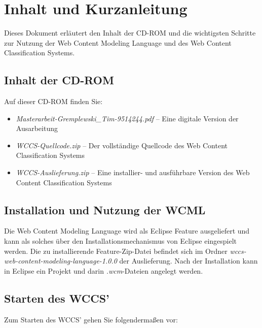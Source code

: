 \documentclass[parskip=half]{scrartcl}
\begin{document}
    \section*{Inhalt und Kurzanleitung}
    Dieses Dokument erläutert den Inhalt der CD-ROM und
    die wichtigsten Schritte zur Nutzung der
    Web Content Modeling Language und des
    Web Content Classification Systems.

    \subsection*{Inhalt der CD-ROM}
        Auf dieser CD-ROM finden Sie:

        \begin{itemize}
            \item \textit{Masterarbeit-Gremplewski\_Tim-9514244.pdf} -- Eine digitale Version der Ausarbeitung
            \item \textit{WCCS-Quellcode.zip} -- Der vollständige Quellcode des Web Content Classification Systems
            \item \textit{WCCS-Auslieferung.zip} -- Eine installier- und ausführbare Version des Web Content Classification Systems
        \end{itemize}

    \subsection*{Installation und Nutzung der WCML}
        Die Web Content Modeling Language wird als Eclipse Feature ausgeliefert
        und kann als solches über den Installationsmechanismus von Eclipse eingespielt werden.
        Die zu installierende Feature-Zip-Datei befindet sich im
        Ordner \textit{wccs-web-content-modeling-language-1.0.0}
        der Auslieferung.
        Nach der Installation kann in Eclipse ein Projekt und darin \textit{.wcm}-Dateien angelegt werden.

    \subsection*{Starten des WCCS'}
        Zum Starten des WCCS' gehen Sie folgendermaßen vor:
\end{document}
